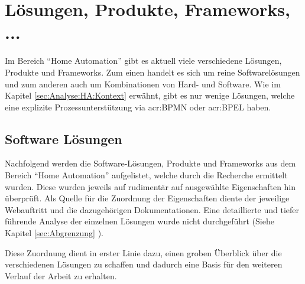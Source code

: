 \begin{itemize}
\end{itemize} 


\section{Lösungen, Produkte, Frameworks, ...}\label{sec:Analyse:HA:LPF}
Im Bereich "`Home Automation"' gibt es aktuell viele verschiedene Lösungen, Produkte und Frameworks. Zum einen handelt es sich um reine Softwarelösungen und zum anderen auch um Kombinationen von Hard- und Software. Wie im Kapitel \ref{sec:Analyse:HA:Kontext}  erwähnt, gibt es nur wenige Lösungen, welche eine explizite Prozessunterstützung via \gls{acr:BPMN} oder \gls{acr:BPEL} haben.

\subsection{Software Lösungen}
Nachfolgend werden die Software-Lösungen, Produkte und Frameworks aus dem Bereich "`Home Automation"' aufgelistet, welche durch die Recherche ermittelt wurden. Diese wurden jeweils auf rudimentär auf ausgewählte Eigenschaften hin überprüft. Als Quelle für die Zuordnung der Eigenschaften diente der jeweilige Webauftritt und die dazugehörigen Dokumentationen. Eine detaillierte und tiefer führende Analyse der einzelnen Lösungen wurde nicht durchgeführt (Siehe Kapitel \ref{sec:Abgrenzung} ).

Diese Zuordnung dient in erster Linie dazu, einen groben Überblick über die verschiedenen Lösungen zu schaffen und dadurch eine Basis für den weiteren Verlauf der Arbeit zu erhalten.


